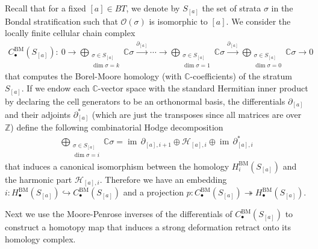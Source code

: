 \documentclass[11pt,reqno]{amsart}
\def\im {{\operatorname{im}}}
\def\C {{\mathbb C}}
\def\Z {{\mathbb Z}}
\theoremstyle{definition}
\numberwithin{equation}{section}
\begin{document}
Recall that for a fixed $[a]\in BT$, we denote by $S_{[a]}$ the set of strata $\sigma$ in the Bondal stratification such that $\mathcal{O}(\sigma)$ is isomorphic to $[a]$. We consider the locally finite cellular chain complex
\begin{align*}
    C^{\mathrm{BM}}_{\bullet}(S_{[a]}):\ 0\rightarrow \bigoplus_{\substack{\sigma\in S_{[a]} \\ \dim\sigma = k}}\C\sigma \xrightarrow{\partial_{[a]}} \cdots \rightarrow \bigoplus_{\substack{\sigma\in S_{[a]} \\ \dim\sigma = 1}}\C\sigma \xrightarrow{\partial_{[a]}} \bigoplus_{\substack{\sigma\in S_{[a]} \\ \dim\sigma = 0}}\C\sigma \rightarrow 0
\end{align*}
that computes the Borel-Moore homology (with $\C$-coefficients) of the stratum $S_{[a]}$. If we endow each $\C$-vector space with the standard Hermitian inner product by declaring the cell generators to be an orthonormal basis, the differentials $\partial_{[a]}$ and their adjoints $\partial_{[a]}^*$ (which are just the transposes since all matrices are over $\Z$) define the following combinatorial Hodge decomposition
\begin{align}\label{eq:comb-hodge-decomposition}
    \bigoplus_{\substack{\sigma\in S_{[a]} \\ \dim\sigma = i}}\C\sigma = \im\,\partial_{[a],i+1}\oplus \mathcal{H}_{[a],i} \oplus \im\,\partial_{[a],i}^*
\end{align}
that induces a canonical isomorphism between the homology $H_i^{\mathrm{BM}}(S_{[a]})$ and the harmonic part $\mathcal{H}_{[a],i}$. Therefore we have an embedding $i: H^{\mathrm{BM}}_{\bullet}(S_{[a]})\hookrightarrow C^{\mathrm{BM}}_{\bullet}(S_{[a]})$ and a projection $p: C^{\mathrm{BM}}_{\bullet}(S_{[a]}) \twoheadrightarrow H^{\mathrm{BM}}_{\bullet}(S_{[a]})$.

\smallskip

Next we use the Moore-Penrose inverses of the differentials of $C^{\mathrm{BM}}_{\bullet}(S_{[a]})$ to construct a homotopy map that induces a strong deformation retract onto its homology complex.
\end{document}
